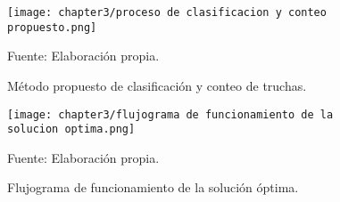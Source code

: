 \begin{landscape}
	\begin{figure}[H]
		\centering
		\texttt{[image: chapter3/proceso de clasificacion y conteo propuesto.png]}
		\caption{Método propuesto de clasificación y conteo de truchas.}%
		\begin{myflushleftportland}
			Fuente: Elaboración propia.
		\end{myflushleftportland}
		\label{fig:proceso de clasificacion y conteo propuesto}
	\end{figure}
\end{landscape}

\begin{landscape}
	\begin{figure}[H]
		\centering
		\texttt{[image: chapter3/flujograma de funcionamiento de la solucion optima.png]}
		\caption{Flujograma de funcionamiento de la solución óptima.}
		\begin{myflushleftportland}
			Fuente: Elaboración propia.
		\end{myflushleftportland}
		\label{fig:flujograma de funcionamiento de la solucion optima}
	\end{figure}
\end{landscape}
